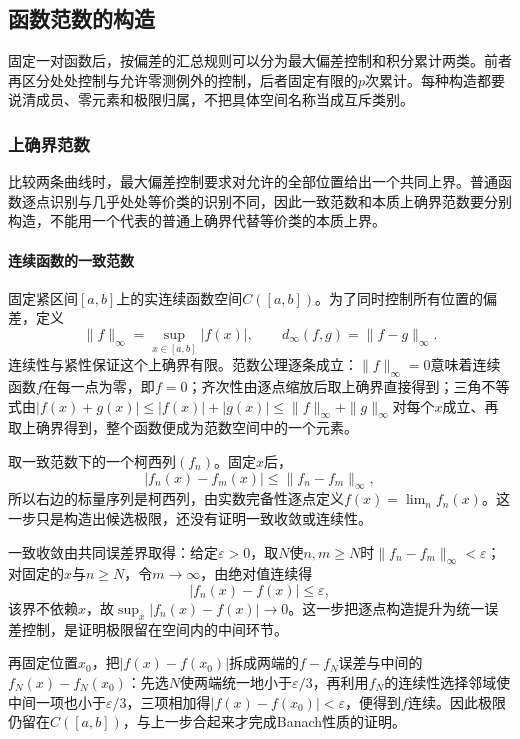 \subsection{函数范数的构造}
\label{subsec:constructing-function-norms}

固定一对函数后，按偏差的汇总规则可以分为最大偏差控制和积分累计两类。前者再区分处处控制与允许零测例外的控制，后者固定有限的$p$次累计。每种构造都要说清成员、零元素和极限归属，不把具体空间名称当成互斥类别。

\subsubsection{上确界范数}
\label{subsubsec:supremum-norm}

比较两条曲线时，最大偏差控制要求对允许的全部位置给出一个共同上界。普通函数逐点识别与几乎处处等价类的识别不同，因此一致范数和本质上确界范数要分别构造，不能用一个代表的普通上确界代替等价类的本质上界。

\paragraph{连续函数的一致范数}

固定紧区间$[a,b]$上的实连续函数空间$C([a,b])$。为了同时控制所有位置的偏差，定义
\[
  \|f\|_\infty=\sup_{x\in[a,b]}|f(x)|,\qquad d_\infty(f,g)=\|f-g\|_\infty.
\]
连续性与紧性保证这个上确界有限。范数公理逐条成立：$\|f\|_\infty=0$意味着连续函数$f$在每一点为零，即$f=0$；齐次性由逐点缩放后取上确界直接得到；三角不等式由$|f(x)+g(x)|\le|f(x)|+|g(x)|\le\|f\|_\infty+\|g\|_\infty$对每个$x$成立、再取上确界得到，整个函数便成为范数空间中的一个元素。

取一致范数下的一个柯西列$(f_n)$。固定$x$后，
\[
  |f_n(x)-f_m(x)|\le\|f_n-f_m\|_\infty,
\]
所以右边的标量序列是柯西列，由实数完备性逐点定义$f(x)=\lim_n f_n(x)$。这一步只是构造出候选极限，还没有证明一致收敛或连续性。

一致收敛由共同误差界取得：给定$\varepsilon>0$，取$N$使$n,m\ge N$时$\|f_n-f_m\|_\infty<\varepsilon$；对固定的$x$与$n\ge N$，令$m\to\infty$，由绝对值连续得
\[
  |f_n(x)-f(x)|\le\varepsilon,
\]
该界不依赖$x$，故$\sup_x|f_n(x)-f(x)|\to0$。这一步把逐点构造提升为统一误差控制，是证明极限留在空间内的中间环节。

再固定位置$x_0$，把$|f(x)-f(x_0)|$拆成两端的$f-f_N$误差与中间的$f_N(x)-f_N(x_0)$：先选$N$使两端统一地小于$\varepsilon/3$，再利用$f_N$的连续性选择邻域使中间一项也小于$\varepsilon/3$，三项相加得$|f(x)-f(x_0)|<\varepsilon$，便得到$f$连续。因此极限仍留在$C([a,b])$，与上一步合起来才完成Banach性质的证明。

